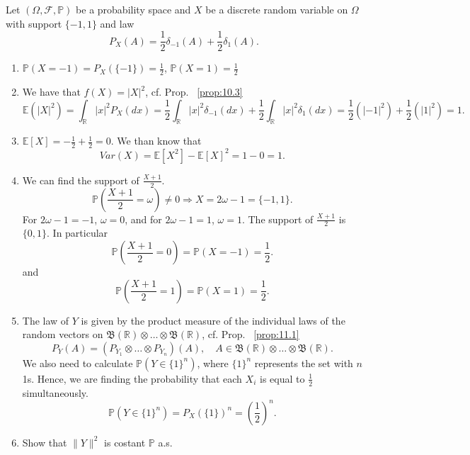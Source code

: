 \begin{exercise}[]
    \label{ex:12.2}
    Let $(\Omega, \mathcal{F}, \mathbb{P})$ be a probability space and $X$ be a discrete random variable on $\Omega$ with 
    support $\{-1,1\} $ and law
    \[
    P_X(A)= \frac{1}{2} \delta_{-1}(A)+\frac{1}{2}\delta_1(A)
    .\] 
    \begin{enumerate}[label=(\alph*)]
        \item
            $\mathbb{P}(X=-1)= P_X(\{-1\} ) = \frac{1}{2}$,
            $\mathbb{P}(X=1) = \frac{1}{2}$
        \item We have that $f(X)=|X|^{2}$, cf. Prop. ~\ref{prop:10.3}
            \[
            \mathbb{E}(|X|^{2}) = \int_{\mathbb{R}}|x|^{2}P_X(dx) 
            = \frac{1}{2} \int_{\mathbb{R}}  \left|x \right|^2 \delta_{-1}(dx) 
            + \frac{1}{2} \int_{\mathbb{R}}  \left|x \right|^2 \delta_{1}(dx)
            = \frac{1}{2}( \left|-1 \right| ^2) + \frac{1}{2}( \left|1 \right| ^2) = 1
            .\] 
        \item $\mathbb{E}[X] = -\frac{1}{2} + \frac{1}{2}= 0$. We than know that
            \[
            Var(X) =\mathbb{E}[X^{2}] - \mathbb{E}[X]^{2} = 1-0=1
            .\] 
        \item
            We can find the support of $\frac{X+1}{2}$.
            \[
                \mathbb{P}\left( \frac{X+1}{2}=\omega \right) \neq 0 \Rightarrow X = 2\omega - 1 = \{-1,1\} 
            .\] 
            For $2\omega-1 = -1$, $\omega=0$, and for  $2\omega-1 = 1$,  $\omega=1$. 
            The support of  $\frac{X+1}{2}$ is $\{0,1\} $.
            In particular
            \[
            \mathbb{P}\left( \frac{X+1}{2} = 0 \right) = \mathbb{P}\left( X=-1 \right) = \frac{1}{2}
            .\] 
            and
            \[
            \mathbb{P}\left( \frac{X+1}{2} = 1 \right) = \mathbb{P}\left( X=1 \right) = \frac{1}{2}
            .\] 
        \item
          The law of $Y $ is given by the product measure of the individual laws of the random vectors
          on $\mathfrak{B}(\mathbb{R}) \otimes \ldots \otimes \mathfrak{B}(\mathbb{R}) $, cf.
          Prop. ~\ref{prop:11.1}
          \[
          P_Y(A) = (P_{Y_1}\otimes\ldots\otimes P_{Y_n})(A), \quad A \in 
          \mathfrak{B}(\mathbb{R}) \otimes \ldots \otimes \mathfrak{B}(\mathbb{R}) 
          .\]
          We also need to calculate $\mathbb{P}(Y \in \{1\}^{n} ) $, where $\{1\}^{n} $ represents
          the set with $n $ 1s. Hence, we are finding the probability that each $X_i $ is equal to
          $\frac{1}{2} $ simultaneously.
          \[
          \mathbb{P}(Y \in \{1\}^{n}) = P_X(\{1\})^{n} = \left(\frac{1}{2}\right)^{n}
          .\] 
        \item
          Show that $\|Y\|^2 $ is costant $\mathbb{P} $ a.s.


\end{enumerate}
\end{exercise}
